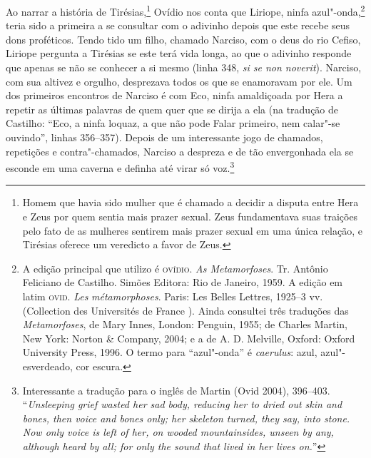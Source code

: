 Ao narrar a história de Tirésias,\footnote{ Homem que havia sido
mulher que é chamado a decidir a disputa entre Hera e Zeus por quem
sentia mais prazer sexual. Zeus fundamentava suas traições pelo fato
de as mulheres sentirem mais prazer sexual em uma única relação, e
Tirésias oferece um veredicto a favor de Zeus.} Ovídio nos conta que
Liriope, ninfa azul"-onda,\footnote{ A edição principal que utilizo é
\textsc{ovídio}. \emph{As Metamorfoses}. Tr. Antônio Feliciano de Castilho.
Simões Editora: Rio de Janeiro, 1959. A edição em latim \textsc{ovid}.\emph{
Les} \emph{métamorphoses}. Paris: Les Belles Lettres, 1925--3 vv.
(Collection des Universités de France ). Ainda consultei três
traduções das \emph{Metamorfoses}, de Mary Innes, London: Penguin,
1955; de Charles Martin, New York: Norton \& Company, 2004; e a de A.
D. Melville, Oxford: Oxford University Press, 1996. O termo para
“azul"-onda” é \emph{caerulus}: azul, azul"-esverdeado, cor escura.}
teria sido a primeira a se consultar com o adivinho depois que este
recebe seus dons proféticos. Tendo tido um filho, chamado Narciso,
com o deus do rio Cefiso, Liriope pergunta a Tirésias se este terá
vida longa, ao que o adivinho responde que apenas se não se conhecer
a si mesmo (linha 348, \emph{si se non noverit}). Narciso, com sua
altivez e orgulho, desprezava todos os que se enamoravam por ele. Um
dos primeiros encontros de Narciso é com Eco, ninfa amaldiçoada por
Hera a repetir as últimas palavras de quem quer que se dirija a ela
(na tradução de Castilho: “Eco, a ninfa loquaz, a que não pode Falar
primeiro, nem calar"-se ouvindo”, linhas 356--357). Depois de um
interessante jogo de chamados, repetições e contra"-chamados, Narciso
a despreza e de tão envergonhada ela se esconde em uma caverna e
definha até virar só voz.\footnote{ Interessante a tradução
para o inglês de Martin (Ovid 2004), 396--403. “\emph{Unsleeping grief
wasted her sad body, reducing her to dried out skin and bones, then
voice and bones only; her skeleton turned, they say, into stone. Now
only voice is left of her, on wooded mountainsides, unseen by any,
although heard by all; for only the sound that lived in her lives
on.}”}

